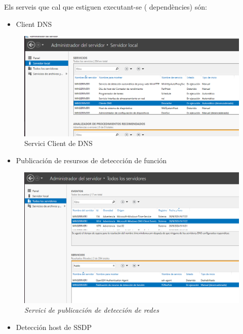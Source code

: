 \documentclass[
  a4paper,
]{article}
\providecommand{\tightlist}{%
  \setlength{\itemsep}{0pt}\setlength{\parskip}{0pt}}
\begin{document}
Els serveis que cal que estiguen executant-se ( dependències) són:

\begin{itemize}
\tightlist
\item
  Client DNS
\end{itemize}

\begin{figure}
\centering
\includegraphics{png/ADDS/ClienteDNS.png}
\caption{Servici Client de DNS}
\end{figure}

\begin{itemize}
\tightlist
\item
  Publicación de resursos de deteccción de función
\end{itemize}

\begin{figure}
\centering
\includegraphics{png/ADDS/PublicacióndeRecursodeDeteccióndeFunción.png}
\caption{\emph{Servici de publicación de detección de redes}}
\end{figure}

\begin{itemize}
\tightlist
\item
  Detección host de SSDP
\end{itemize}
\end{document}
